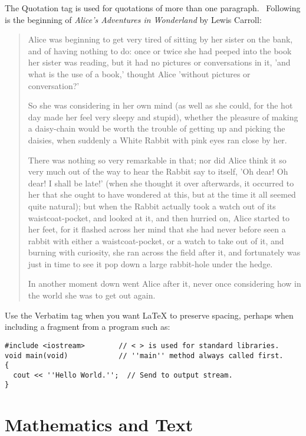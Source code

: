 \documentclass[11pt,spanish]{report}
\begin{document}
The Quotation tag is used for quotations of more than one paragraph.
\ Following is the beginning of \emph{Alice's Adventures in Wonderland }by
Lewis Carroll:

\begin{quotation}
Alice was beginning to get very tired of sitting by her sister on the bank,
and of having nothing to do: once or twice she had peeped into the book her
sister was reading, but it had no pictures or conversations in it, 'and what
is the use of a book,' thought Alice 'without pictures or conversation?'

So she was considering in her own mind (as well as she could, for the hot day
made her feel very sleepy and stupid), whether the pleasure of making a
daisy-chain would be worth the trouble of getting up and picking the daisies,
when suddenly a White Rabbit with pink eyes ran close by her.

There was nothing so very remarkable in that; nor did Alice think it so very
much out of the way to hear the Rabbit say to itself, 'Oh dear! Oh dear! I
shall be late!' (when she thought it over afterwards, it occurred to her that
she ought to have wondered at this, but at the time it all seemed quite
natural); but when the Rabbit actually took a watch out of its
waistcoat-pocket, and looked at it, and then hurried on, Alice started to her
feet, for it flashed across her mind that she had never before seen a rabbit
with either a waistcoat-pocket, or a watch to take out of it, and burning with
curiosity, she ran across the field after it, and fortunately was just in time
to see it pop down a large rabbit-hole under the hedge.

In another moment down went Alice after it, never once considering how in the
world she was to get out again.
\end{quotation}

Use the Verbatim tag when you want \LaTeX {} to preserve spacing, perhaps when
including a fragment from a program such as:
\begin{verbatim}
#include <iostream>        // < > is used for standard libraries.
void main(void)            // ''main'' method always called first.
{
  cout << ''Hello World.'';  // Send to output stream.
}
\end{verbatim}

\section{Mathematics and Text}
\end{document}
